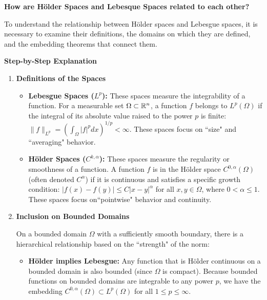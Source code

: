 \documentclass[12pt,a4paper]{report}
\begin{document}
\begin{description}

\item \textbf{How are H\"older Spaces and Lebesque Spaces related to each other?}

To understand the relationship between Hölder spaces and Lebesgue spaces, it is necessary to examine their definitions, the domains on which they are defined, and the embedding theorems that connect them.

\textbf{Step-by-Step Explanation}

\begin{enumerate}

\item \textbf{Definitions of the Spaces}
\begin{itemize}

	\item \textbf{Lebesgue Spaces ($L^p$):} These spaces measure the integrability of a function. For a measurable set $\Omega \subset \mathbb{R}^n$, a function $f$ belongs to $L^p(\Omega)$ if the integral of its absolute value raised to the power $p$ is finite: $\|f\|_{L^p} = (\int_{\Omega} |f|^p dx)^{1/p} < \infty$. These spaces focus on ``size" and ``averaging" behavior.

	\item \textbf{Hölder Spaces ($C^{k, \alpha}$):} These spaces measure the regularity or smoothness of a function. A function $f$ is in the Hölder space $C^{0, \alpha}(\Omega)$ (often denoted $C^\alpha$) if it is continuous and satisfies a specific growth condition: $|f(x) - f(y)| \leq C|x - y|^\alpha$ for all $x, y \in \Omega$, where $0 < \alpha \leq 1$. These spaces focus on``pointwise" behavior and continuity.

\end{itemize}

\item  \textbf{Inclusion on Bounded Domains}

On a bounded domain $\Omega$ with a sufficiently smooth boundary, there is a hierarchical relationship based on the ``strength" of the norm:

\begin{itemize}

	\item \textbf{Hölder implies Lebesgue:} Any function that is Hölder continuous on a bounded domain is also bounded (since $\Omega$ is compact). Because bounded functions on bounded domains are integrable to any power $p$, we have the embedding $C^{0, \alpha}(\Omega) \subset L^p(\Omega)$ for all $1 \leq p \leq \infty$.
	

\end{itemize}
\end{enumerate}
\end{description}
\end{document}
